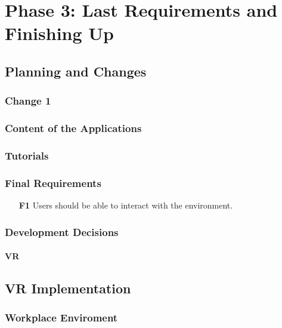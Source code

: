 
\chapter{Phase 3: Last Requirements and Finishing Up} \label{chap:7}
\label{chap:phase3}

\section{Planning and Changes}

\subsection{Change 1}

\subsection{Content of the Applications}


\subsection{Tutorials}

\subsection{Final Requirements}
\begin{enumerate}
  \item [\textbf{F1}] Users should be able to interact with the environment.
\end{enumerate}



\subsection{Development Decisions}
\subsubsection{VR}

\section{VR Implementation}

\subsection{Workplace Enviroment}
